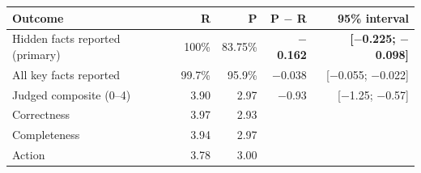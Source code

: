 \begin{tabular}{lrrrr}
\toprule
Outcome & R & P & P $-$ R & 95\% interval \\
\midrule
Hidden facts reported (primary) & 100\% & 83.75\% & \textbf{$-$0.162} & \textbf{[$-$0.225; $-$0.098]} \\
All key facts reported & 99.7\% & 95.9\% & $-$0.038 & [$-$0.055; $-$0.022] \\
Judged composite (0--4) & 3.90 & 2.97 & $-$0.93 & [$-$1.25; $-$0.57] \\
\quad Correctness & 3.97 & 2.93 & & \\
\quad Completeness & 3.94 & 2.97 & & \\
\quad Action & 3.78 & 3.00 & & \\
\bottomrule
\end{tabular}
